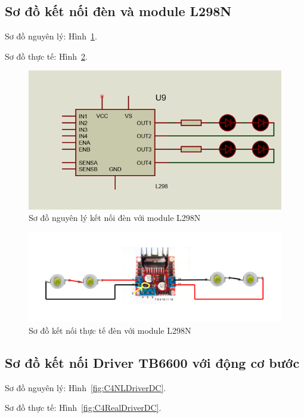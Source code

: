 \subsection{Sơ đồ kết nối đèn và module L298N}
Sơ đồ nguyên lý: Hình~\ref{fig:C4NLDenL298N}.

Sơ đồ thực tế: Hình~\ref{fig:C4RealDenL298N}.
\begin{figure}[htp]
	\centering
	\includegraphics[scale=1]{Chapters/Chapter4/Images/DenL298N.png}
	\caption{Sơ đồ nguyên lý kết nối đèn với module L298N}
	\label{fig:C4NLDenL298N}
\end{figure}
\begin{figure}[htp]
	\centering
	\includegraphics[scale=1]{Chapters/Chapter4/Images/RealDenL298N.png}
	\caption{Sơ đồ kết nối thực tế đèn với module L298N}
	\label{fig:C4RealDenL298N}
\end{figure}

\subsection{Sơ đồ kết nối Driver TB6600 với động cơ bước}
Sơ đồ nguyên lý: Hình~\ref{fig:C4NLDriverDC}.

Sơ đồ thực tế: Hình~\ref{fig:C4RealDriverDC}.

